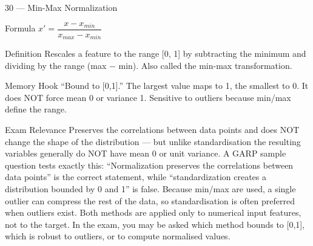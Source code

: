 \documentclass[aspectratio=169,8pt]{beamer}
\begin{document}
	\begin{frame}{30 --- Min-Max Normalization}
		\begin{block}{Formula}
			$x' = \dfrac{x - x_{min}}{x_{max} - x_{min}}$
		\end{block}
		\begin{block}{Definition}
			Rescales a feature to the range [0, 1] by subtracting the minimum and dividing by the range (max $-$ min). Also called the min-max transformation.
		\end{block}
		\begin{block}{Memory Hook}
			``Bound to [0,1].'' The largest value maps to 1, the smallest to 0. It does NOT force mean 0 or variance 1. Sensitive to outliers because min/max define the range.
		\end{block}
		\begin{block}{Exam Relevance}
			Preserves the correlations between data points and does NOT change the shape of the distribution --- but unlike standardisation the resulting variables generally do NOT have mean 0 or unit variance. A GARP sample question tests exactly this: ``Normalization preserves the correlations between data points'' is the correct statement, while ``standardization creates a distribution bounded by 0 and 1'' is false. Because min/max are used, a single outlier can compress the rest of the data, so standardisation is often preferred when outliers exist. Both methods are applied only to numerical input features, not to the target. In the exam, you may be asked which method bounds to [0,1], which is robust to outliers, or to compute normalised values.
		\end{block}
	\end{frame}
	
\end{document}
